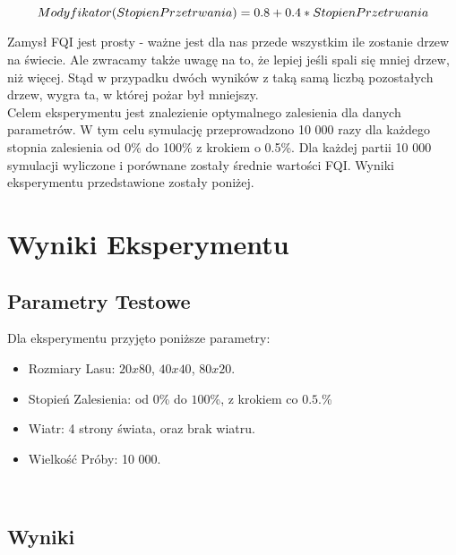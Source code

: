 \documentclass{article}
\begin{document}
\[
Modyfikator(StopienPrzetrwania) = 0.8 + 0.4 * StopienPrzetrwania\\
\]

Zamysł FQI jest prosty - ważne jest dla nas przede wszystkim ile zostanie drzew na świecie. Ale zwracamy także uwagę na to, że lepiej jeśli spali się mniej drzew, niż więcej. Stąd w przypadku dwóch wyników z taką samą liczbą pozostałych drzew, wygra ta, w której pożar był mniejszy.\vspace{2ex}\\

Celem eksperymentu jest znalezienie optymalnego zalesienia dla danych parametrów. W tym celu symulację przeprowadzono 10 000 razy dla każdego stopnia zalesienia od 0\% do 100\% z krokiem o 0.5\%. Dla każdej partii 10 000 symulacji wyliczone i porównane zostały średnie wartości FQI. Wyniki eksperymentu przedstawione zostały poniżej.\\

\newpage
\section{Wyniki Eksperymentu}
\subsection{Parametry Testowe}
Dla eksperymentu przyjęto poniższe parametry:\\
\begin{itemize}
  \item Rozmiary Lasu: $20x80$, $40x40$, $80x20$.
  \item Stopień Zalesienia: od $0$\% do $100$\%, z krokiem co $0.5$.\%
  \item Wiatr: 4 strony świata, oraz brak wiatru.
  \item Wielkość Próby: 10 000.
\end{itemize}\\

\subsection{Wyniki}
\end{document}
